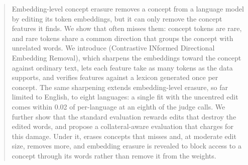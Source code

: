 \begin{abstract}
Embedding-level concept erasure removes a concept from a language model by editing its token embeddings, but it can only remove the concept features it finds.
We show that \ember{} often misses them: concept tokens are rare, and rare tokens share a common direction that groups the concept with unrelated words.
We introduce \cinder{} (Contrastive INformed Directional Embedding Removal), which sharpens the embeddings toward the concept against ordinary text, lets each feature take as many tokens as the data supports, and verifies features against a lexicon generated once per concept.
The same sharpening extends embedding-level erasure, so far limited to English, to eight languages: a single fit with the uncentred \cinderz{} edit comes within 0.02 of per-language \ember{} at an eighth of the judge calls.
We further show that the standard evaluation rewards edits that destroy the edited words, and propose a collateral-aware evaluation that charges for this damage.
Under it, \cinder{} erases concepts that \ember{} misses and, at moderate edit size, removes more, and embedding erasure is revealed to block access to a concept through its words rather than remove it from the weights.
\end{abstract}
